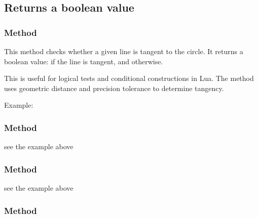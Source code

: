 \subsection{Returns a boolean value}

\subsubsection{Method }
\label{ssub:method_circle_is_tangent}

This method checks whether a given line is tangent to the circle. It returns a boolean value:  if the line is tangent, and  otherwise.

\medskip

This is useful for logical tests and conditional constructions in Lua. The method uses geometric distance and precision tolerance to determine tangency.

\medskip

Example:

\begin{tkzexample}[latex=.5\textwidth]
\end{tkzexample}

\subsubsection{Method }
\label{ssub:method_circle_is_secant}
see the example above

\subsubsection{Method }
\label{ssub:method_circle_is_disjoint}
see the example above

 \subsubsection{Method }
 \label{ssub:power}

